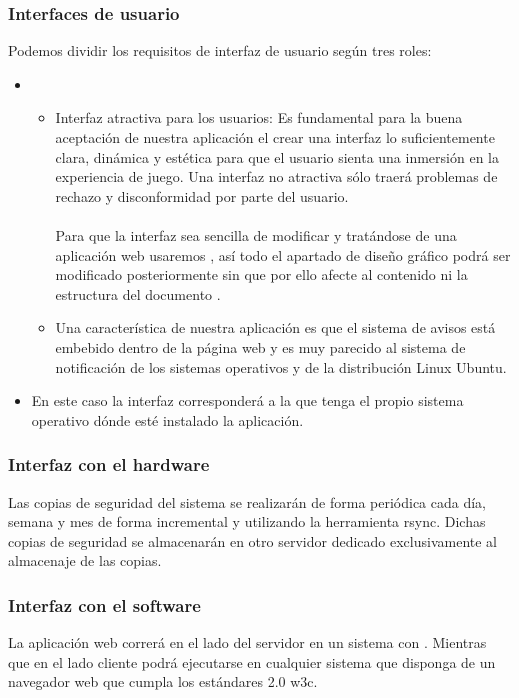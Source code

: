 \subsubsection{Interfaces de usuario}
Podemos dividir los requisitos de interfaz de usuario según tres roles:

\begin{itemize}
\item {}
  \begin{itemize}
  \item Interfaz atractiva para los usuarios: Es fundamental para la buena
    aceptación de nuestra aplicación el crear una interfaz lo suficientemente
    clara, dinámica y estética para que el usuario sienta una inmersión en la
    experiencia de juego. Una interfaz no atractiva sólo traerá problemas de
    rechazo y disconformidad por parte del usuario.\\\\
    Para que la interfaz sea sencilla de modificar y tratándose de una
    aplicación web usaremos , así todo el apartado
    de diseño gráfico podrá ser modificado posteriormente sin que por ello
    afecte al contenido ni la estructura del documento .
  \item Una característica de nuestra aplicación es que el sistema de avisos
    está embebido dentro de la página web y es muy parecido al sistema de
    notificación de los sistemas operativos  y de la \cursiva
    {distribución Linux Ubuntu}.
  \end{itemize}
\item {} En este caso la interfaz corresponderá a la que
  tenga el propio sistema operativo dónde esté instalado la aplicación.
\end{itemize}
\subsubsection{Interfaz con el hardware}
Las copias de seguridad del sistema se realizarán de forma periódica cada día, semana y mes de forma incremental y utilizando la herramienta rsync. Dichas copias de seguridad se almacenarán en otro
servidor dedicado exclusivamente al almacenaje de las copias.

\subsubsection{Interfaz con el software}
La aplicación web correrá en el lado del servidor en un sistema 
con . Mientras que en el lado cliente podrá
ejecutarse en cualquier sistema que disponga de un navegador web que cumpla los
estándares 2.0 w3c.

